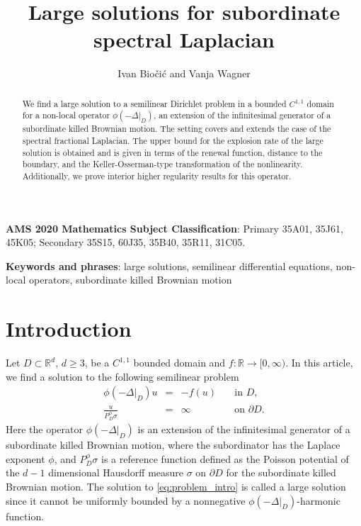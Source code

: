 \documentclass[12pt,a4paper,onecolumn]{amsart}
\title[Large solutions for subordinate spectral]{Large solutions for subordinate spectral Laplacian}
\author{Ivan Bio\v{c}i\'{c} and Vanja Wagner}
\date{}
\theoremstyle{definition}
\newcommand{\R}{\mathbb{R}}
\newcommand{\1}{\mathbf 1}
\newcommand{\Lo}{\phi(-\left.\Delta\right\vert_{D})}
\newcommand{\PDfi}{P^\phi_{ D}}
\newcommand{\PDFI}{\PDfi}
\numberwithin{equation}{section}
\begin{document}
	

\begin{abstract}
    We find a large solution to a semilinear Dirichlet problem in a bounded $C^{1,1}$ domain for a non-local operator $\phi(-\Delta\vert_{D})$, an extension of the infinitesimal generator of a subordinate killed Brownian motion. The setting covers and extends the case of the spectral fractional Laplacian. The upper bound for the explosion rate of the large solution is obtained and is given in terms of the renewal function, distance to the boundary, and the Keller-Osserman-type transformation of the nonlinearity. 
    Additionally, we prove interior higher regularity results for this operator.
\end{abstract}
\maketitle
\bigskip\noindent
{\bf AMS 2020 Mathematics Subject Classification}: Primary 35A01, 35J61, 45K05; 
Secondary 35S15, 60J35, 35B40, 35R11, 31C05. 

	
\bigskip\noindent
{\bf Keywords and phrases}: large solutions, semilinear differential equations, non-local operators, subordinate killed Brownian motion



\section{Introduction}

Let $D\subset \R^d$, $d\ge3$, be a $C^{1,1}$ bounded domain and $f:\R\to [0,\infty)$. In this article, we find a solution to the following semilinear problem
\begin{equation}\label{eq:problem_intro}
	\begin{array}{rcll}
		\Lo u&=& - f(u)& \quad \text{in } D,\\
		\frac{u}{\PDFI\sigma}&=&\infty&\quad \text{on }\partial D.
	\end{array}
\end{equation}
Here the operator $\Lo$ is an extension of the infinitesimal generator of a subordinate killed Brownian motion, where the subordinator has the Laplace exponent $\phi$, and $\PDFI\sigma$ is a reference function defined as the Poisson potential of the $d-1$ dimensional Hausdorff measure $\sigma$  on $\partial D$ for the subordinate killed  Brownian motion. The solution to \eqref{eq:problem_intro} is called a large solution since it cannot be uniformly bounded by a nonnegative $\Lo$-harmonic function.
\end{document}
